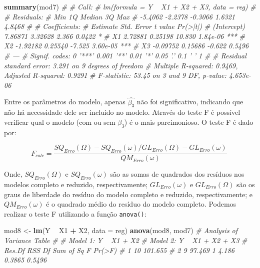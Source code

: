 \documentclass[
]{book}
\newenvironment{Shaded}{\begin{snugshade}}{\end{snugshade}}
\newcommand{\CommentTok}[1]{\textcolor[rgb]{0.56,0.35,0.01}{\textit{#1}}}
\newcommand{\DataTypeTok}[1]{\textcolor[rgb]{0.13,0.29,0.53}{#1}}
\newcommand{\KeywordTok}[1]{\textcolor[rgb]{0.13,0.29,0.53}{\textbf{#1}}}
\newcommand{\NormalTok}[1]{#1}
\newcommand{\OperatorTok}[1]{\textcolor[rgb]{0.81,0.36,0.00}{\textbf{#1}}}
\newcommand{\StringTok}[1]{\textcolor[rgb]{0.31,0.60,0.02}{#1}}
\begin{document}
\begin{Shaded}
\begin{Highlighting}[]
\KeywordTok{summary}\NormalTok{(mod7)}
\CommentTok{# }
\CommentTok{# Call:}
\CommentTok{# lm(formula = Y ~ X1 + X2 + X3, data = reg)}
\CommentTok{# }
\CommentTok{# Residuals:}
\CommentTok{#     Min      1Q  Median      3Q     Max }
\CommentTok{# -5.4062 -2.2378 -0.3066  1.6321  4.8468 }
\CommentTok{# }
\CommentTok{# Coefficients:}
\CommentTok{#             Estimate Std. Error t value Pr(>|t|)    }
\CommentTok{# (Intercept)  7.86871    3.32628   2.366   0.0422 *  }
\CommentTok{# X1           2.72881    0.25198  10.830 1.84e-06 ***}
\CommentTok{# X2          -1.92182    0.25540  -7.525 3.60e-05 ***}
\CommentTok{# X3          -0.09752    0.15686  -0.622   0.5496    }
\CommentTok{# ---}
\CommentTok{# Signif. codes:  0 '***' 0.001 '**' 0.01 '*' 0.05 '.' 0.1 ' ' 1}
\CommentTok{# }
\CommentTok{# Residual standard error: 3.291 on 9 degrees of freedom}
\CommentTok{# Multiple R-squared:  0.9469,	Adjusted R-squared:  0.9291 }
\CommentTok{# F-statistic: 53.45 on 3 and 9 DF,  p-value: 4.653e-06}
\end{Highlighting}
\end{Shaded}

Entre os parâmetros do modelo, apenas \(\hat{\beta_3}\) não foi significativo, indicando que não há necessidade dele ser incluido no modelo. Através do teste F é possível verificar qual o modelo (com ou sem \(\beta_3\)) é o mais parcimonioso. O teste F é dado por:

\[
F_{calc} = \frac{S{Q_{Erro}}(\Omega)- S{Q_{Erro}}(\omega)/G{L_{Erro}}(\Omega)- G{L_{Erro}}(\omega)} {Q{M_{Erro}}(\omega )}\
\]

Onde, \(SQ_{Erro}(\Omega)\) e \(SQ_{Erro}(\omega)\) são as somas de quadrados dos resíduos  nos modelos completo e reduzido, respectivamente; \(G{L_{Erro}}(\omega)\) e \(G{L_{Erro}}(\Omega)\) são os graus de liberdade do resíduo do modelo completo e reduzido, respectivamente; e \(Q{M_{Erro}}(\omega )\) é o quadrado médio do resíduo do modelo completo. Podemos realizar o teste F utilizando a função \texttt{anova()}:

\begin{Shaded}
\begin{Highlighting}[]
\NormalTok{mod8 <-}\StringTok{ }\KeywordTok{lm}\NormalTok{(Y }\OperatorTok{~}\StringTok{ }\NormalTok{X1 }\OperatorTok{+}\StringTok{ }\NormalTok{X2, }\DataTypeTok{data =}\NormalTok{ reg)}
\KeywordTok{anova}\NormalTok{(mod8, mod7)}
\CommentTok{# Analysis of Variance Table}
\CommentTok{# }
\CommentTok{# Model 1: Y ~ X1 + X2}
\CommentTok{# Model 2: Y ~ X1 + X2 + X3}
\CommentTok{#   Res.Df     RSS Df Sum of Sq      F Pr(>F)}
\CommentTok{# 1     10 101.655                           }
\CommentTok{# 2      9  97.469  1     4.186 0.3865 0.5496}
\end{Highlighting}
\end{Shaded}
\end{document}
